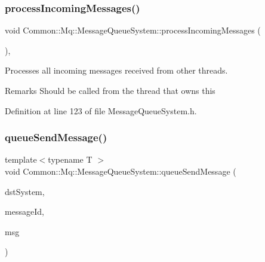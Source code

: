\subsubsection{\texorpdfstring{process\+Incoming\+Messages()}{processIncomingMessages()}}
{\footnotesize\ttfamily void Common\+::\+Mq\+::\+Message\+Queue\+System\+::process\+Incoming\+Messages (\begin{DoxyParamCaption}\item[{void}]{ }\end{DoxyParamCaption})\hspace{0.3cm}{\ttfamily [inline]}, {\ttfamily [protected]}}

Processes all incoming messages received from other threads. \begin{DoxyRemark}{Remarks}
Should be called from the thread that owns \textquotesingle{}this\textquotesingle{} 
\end{DoxyRemark}


Definition at line 123 of file Message\+Queue\+System.\+h.

\mbox{\label{class_common_1_1_mq_1_1_message_queue_system_ab9a6196ad22221175ec636ea2b08ec5d}} 
\subsubsection{\texorpdfstring{queue\+Send\+Message()}{queueSendMessage()}}
{\footnotesize\ttfamily template$<$typename T $>$ \\
void Common\+::\+Mq\+::\+Message\+Queue\+System\+::queue\+Send\+Message (\begin{DoxyParamCaption}\item[{\hyperlink{class_common_1_1_mq_1_1_message_queue_system}{Message\+Queue\+System} $\ast$}]{dst\+System,  }\item[{\hyperlink{group___common_gaa8c87d2b450282716c906da283e149e6}{Mq\+::\+Message\+Id}}]{message\+Id,  }\item[{const T \&}]{msg }\end{DoxyParamCaption})\hspace{0.3cm}{\ttfamily [inline]}}

